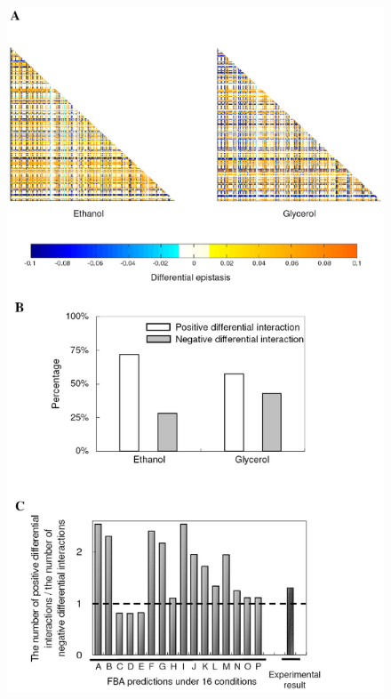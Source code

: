 \documentclass{article}
\begin{document}
\begin{figure}[H]
\caption{}
\label{fig:eef1}
\centering
\includegraphics[height=0.95\textheight]{envFigure_1}
\end{figure}
\end{document}
